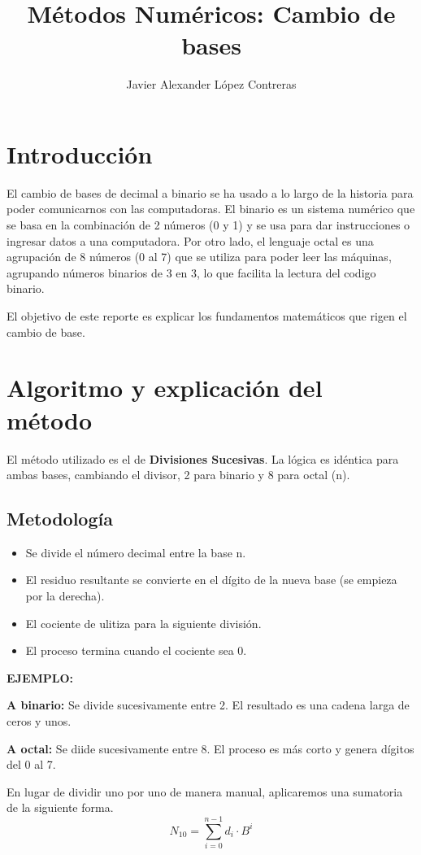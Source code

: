 \documentclass[11pt,a4paper,twocolumn]{article}
\title{Métodos Numéricos: Cambio de bases}
\author{Javier Alexander López Contreras}
\begin{document}
\maketitle
\section{Introducción}
El cambio de bases de decimal a binario se ha usado a lo largo de la historia para poder comunicarnos con las computadoras. El binario es un sistema numérico que se basa en la combinación de 2 números (0 y 1) y se usa para dar instrucciones o ingresar datos a una computadora. Por otro lado, el lenguaje octal es una agrupación de 8 números (0 al 7) que se utiliza para poder leer las máquinas, agrupando números binarios de 3 en 3, lo que facilita la lectura del codigo binario.

El objetivo de este reporte es explicar los fundamentos matemáticos que rigen el cambio de base.

\section{Algoritmo y explicación del método}
El método utilizado es el de \textbf{Divisiones Sucesivas}. La lógica es idéntica para ambas bases, cambiando el divisor, 2 para binario y 8 para octal (n).

\subsection{Metodología}
\begin{itemize}
\item Se divide el número decimal entre la base n.
\item El residuo resultante se convierte en el dígito de la nueva base (se empieza por la derecha).
\item El cociente de ulitiza para la siguiente división.
\item El proceso termina cuando el cociente sea 0.
\end{itemize}

\textbf{EJEMPLO:}

\textbf{A binario:} Se divide sucesivamente entre 2. El resultado es una cadena larga de ceros y unos.

\textbf{A octal:} Se diide sucesivamente entre 8. El proceso es más corto y genera dígitos del 0 al 7.

En lugar de dividir uno por uno de manera manual, aplicaremos una sumatoria de la siguiente forma.
\begin{equation}
    N_{10} = \sum_{i=0}^{n-1} d_i \cdot B^i
\end{equation}
\end{document}
